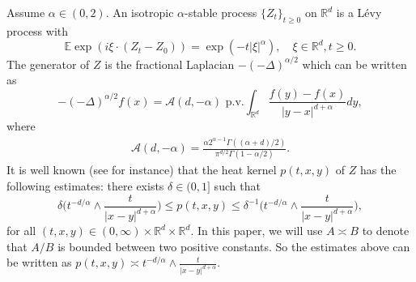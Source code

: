 \documentclass[12pt,a4paper]{amsart}
\numberwithin{equation}{section}
\theoremstyle{plain}
\newcommand{\mc}{\mathcal}
\newcommand{\mb}{\mathbb}
\newcommand{\R}{\mathbb{R}}
\newcommand{\1}{\mathbbm{1}}
\begin{document}
Assume $\alpha\in (0, 2)$. An isotropic $\alpha$-stable process $\{Z_t\}_{t\ge0}$ on $\R^d$ is a  L\'evy process with
\begin{equation*}
\mb{E}\exp(i\xi \cdot (Z_t-Z_0)) = \exp(-t|\xi|^{\alpha}), 
\quad \xi \in \mb{R}^d, t\ge 0.
\end{equation*}
The generator of $Z$ is the  fractional Laplacian
$-(-\Delta)^{\alpha/2}$ which can be written as
$$
-(-\Delta)^{\alpha/2}f(x)=\mc{A}(d,-\alpha)\text{ p.v.}\int_{\R^d}\frac{f(y)-f(x)}{|y-x|^{d+\alpha}}dy,
$$
where
\begin{align}\label{e:constantA}
\mc{A}(d,-\alpha)=\frac{\alpha2^{\alpha-1}\Gamma((\alpha+d)/2)}{\pi^{d/2}\Gamma(1-\alpha/2)}.
\end{align}
It is well known (see \cite{BG60} for instance) that the heat kernel $p(t,x,y)$ of 
$Z$ has the following estimates:
there exists $\delta \in (0,1]$ such that
\begin{equation*}
\delta \big( t^{-d/\alpha} \wedge \frac{t}{|x-y|^{d+\alpha}} \big) \le p(t,x,y) \le \delta^{-1} \big( t^{-d/\alpha} \wedge \frac{t}{|x-y|^{d+\alpha}} \big),
\end{equation*}
for all $(t,x,y) \in (0,\infty) \times \mb{R}^d \times \mb{R}^d$. 
In this paper, we will use
$A\asymp B$ to denote that $A/B$ is bounded between two positive constants. So the estimates above can be written as $p(t,x,y)\asymp t^{-d/\alpha} \wedge \frac{t}{|x-y|^{d+\alpha}}$. 
\end{document}
